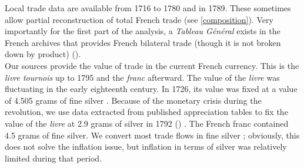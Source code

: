 \documentclass[12pt,a4paper,notitlepage,english]{article}
\begin{document}
Local trade data are available from 1716 to 1780 and in 1789. These sometimes allow partial reconstruction of total French trade (see \ref{composition}).
Very importantly for the first part of the analysis, a \textit{Tableau Général} exists in the French archives that provides French bilateral trade (though it is not broken down by product) (\cite{Romano1957}). \\
Our sources provide the value of trade in the current French currency. This is the \textit{livre tournois} up to 1795 and the \textit{franc} afterward. The value of the \textit{livre} was fluctuating in the early eighteenth century. In 1726, its value was fixed at a value of 4.505 grams of fine silver \citep{Dewailly1857}. Because of the monetary crisis during the revolution, we use data extracted from published appreciation tables to fix the value of the \textit{livre} at 2.9 grams of silver in 1792 (\cite{Hoffman2000}) . The French franc contained 4.5 grams of fine silver. We convert most trade flows in fine silver ; obviously, this does not solve the inflation issue, but inflation in terms of silver was relatively limited during that period.
\end{document}
